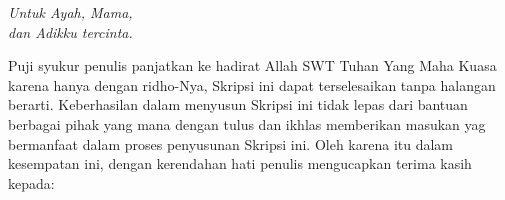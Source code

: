 \documentclass{jtetiskripsi}
\begin{document}
\cover



\acknowledgment
\begin{flushright}
	\emph{Untuk Ayah, Mama,\\dan Adikku tercinta.}
\end{flushright}
\preface

Puji syukur penulis panjatkan ke hadirat Allah SWT Tuhan Yang Maha Kuasa karena hanya dengan ridho-Nya, Skripsi ini dapat terselesaikan tanpa halangan berarti. Keberhasilan dalam menyusun Skripsi ini tidak lepas dari bantuan berbagai pihak yang mana dengan tulus dan ikhlas memberikan masukan yag bermanfaat dalam proses penyusunan Skripsi ini. Oleh karena itu dalam kesempatan ini, dengan kerendahan hati penulis mengucapkan terima kasih kepada:
\end{document}
